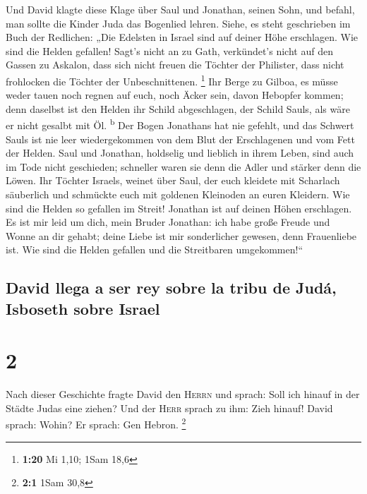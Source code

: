  Und David klagte diese Klage über Saul und Jonathan,
seinen Sohn,  und befahl, man sollte die Kinder Juda das
Bogenlied lehren. Siehe, es steht geschrieben im Buch der Redlichen:
 „Die Edelsten in Israel sind auf deiner Höhe erschlagen.
Wie sind die Helden gefallen!  Sagt's nicht an zu Gath,
verkündet's nicht auf den Gassen zu Askalon, dass sich nicht freuen die
Töchter der Philister, dass nicht frohlocken die Töchter der
Unbeschnittenen. \footnote{\textbf{1:20} Mi 1,10; 1Sam 18,6}
 Ihr Berge zu Gilboa, es müsse weder tauen noch regnen
auf euch, noch Äcker sein, davon Hebopfer kommen; denn daselbst ist den
Helden ihr Schild abgeschlagen, der Schild Sauls, als wäre er nicht
gesalbt mit Öl. \textsuperscript{b}  Der Bogen Jonathans
hat nie gefehlt, und das Schwert Sauls ist nie leer wiedergekommen von
dem Blut der Erschlagenen und vom Fett der Helden.  Saul
und Jonathan, holdselig und lieblich in ihrem Leben, sind auch im Tode
nicht geschieden; schneller waren sie denn die Adler und stärker denn
die Löwen.  Ihr Töchter Israels, weinet über Saul, der
euch kleidete mit Scharlach säuberlich und schmückte euch mit goldenen
Kleinoden an euren Kleidern.  Wie sind die Helden so
gefallen im Streit! Jonathan ist auf deinen Höhen erschlagen.
 Es ist mir leid um dich, mein Bruder Jonathan: ich habe
große Freude und Wonne an dir gehabt; deine Liebe ist mir sonderlicher
gewesen, denn Frauenliebe ist.  Wie sind die Helden
gefallen und die Streitbaren umgekommen!{}``

\hypertarget{david-llega-a-ser-rey-sobre-la-tribu-de-juduxe1-isboseth-sobre-israel}{%
\subsection{David llega a ser rey sobre la tribu de Judá, Isboseth sobre
Israel}\label{david-llega-a-ser-rey-sobre-la-tribu-de-juduxe1-isboseth-sobre-israel}}

\hypertarget{section-1}{%
\section{2}\label{section-1}}

 Nach dieser Geschichte fragte David den \textsc{Herrn}
und sprach: Soll ich hinauf in der Städte Judas eine ziehen? Und der
\textsc{Herr} sprach zu ihm: Zieh hinauf! David sprach: Wohin? Er
sprach: Gen Hebron. \footnote{\textbf{2:1} 1Sam 30,8}

